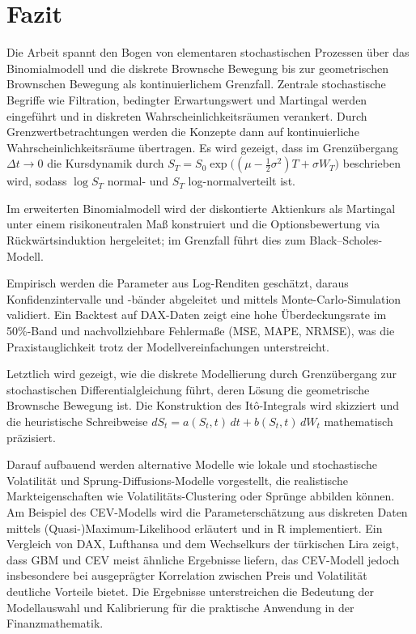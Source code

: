 \section{Fazit}

Die Arbeit spannt den Bogen von elementaren stochastischen Prozessen über das Binomialmodell und die diskrete Brownsche 
Bewegung bis zur geometrischen Brownschen Bewegung als kontinuierlichem Grenzfall. Zentrale stochastische Begriffe wie 
Filtration, bedingter Erwartungswert und Martingal werden eingeführt und in diskreten Wahrscheinlichkeitsräumen verankert. 
Durch Grenzwertbetrachtungen werden die Konzepte dann auf kontinuierliche Wahrscheinlichkeitsräume übertragen. Es wird gezeigt, dass im Grenzübergang $\Delta t \to 0$ die Kursdynamik durch
$S_T = S_0 \exp\!\big((\mu - \tfrac12\sigma^2)T + \sigma W_T\big)$
beschrieben wird, sodass $\log S_T$ normal- und $S_T$ log-normalverteilt ist. 

Im erweiterten Binomialmodell wird der diskontierte Aktienkurs als Martingal unter einem risikoneutralen Maß konstruiert und die Optionsbewertung 
via Rückwärtsinduktion hergeleitet; im Grenzfall führt dies zum Black–Scholes-Modell.

Empirisch werden die Parameter aus 
Log-Renditen geschätzt, daraus Konfidenzintervalle und -bänder abgeleitet und mittels Monte-Carlo-Simulation validiert. 
Ein Backtest auf DAX-Daten zeigt eine hohe Überdeckungsrate im 50\%-Band und nachvollziehbare Fehlermaße (MSE, MAPE, NRMSE), 
was die Praxistauglichkeit trotz der Modellvereinfachungen unterstreicht. 

Letztlich wird gezeigt, wie die diskrete Modellierung durch Grenzübergang zur stochastischen Differentialgleichung führt, deren Lösung die 
geometrische Brownsche Bewegung ist. Die Konstruktion des Itô-Integrals wird skizziert und die 
heuristische Schreibweise $dS_t = a(S_t,t)\,dt + b(S_t,t)\,dW_t$ mathematisch präzisiert.

Darauf aufbauend werden alternative Modelle wie lokale und stochastische Volatilität und Sprung-Diffusions-Modelle vorgestellt, die realistische Markteigenschaften wie Volatilitäts-Clustering oder Sprünge abbilden können. 
Am Beispiel des CEV-Modells wird die Parameterschätzung aus diskreten Daten mittels (Quasi-)Maximum-Likelihood 
erläutert und in R implementiert. Ein Vergleich von DAX, Lufthansa und dem Wechselkurs der türkischen Lira zeigt, dass GBM und CEV meist ähnliche Ergebnisse liefern, das CEV-Modell jedoch insbesondere bei ausgeprägter Korrelation zwischen Preis und Volatilität deutliche Vorteile bietet. Die Ergebnisse unterstreichen die Bedeutung der
Modellauswahl und Kalibrierung für die praktische Anwendung in der Finanzmathematik.


